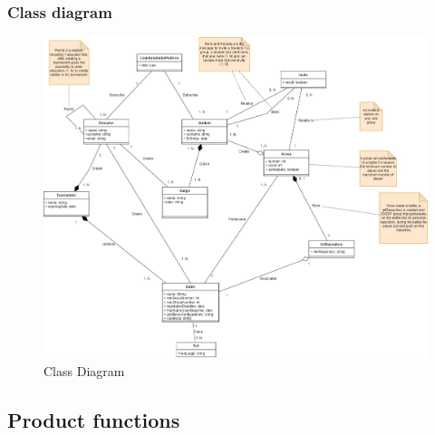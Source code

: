 \documentclass{article}
\begin{document}
{        \subsubsection{Class diagram}
        \begin{figure}[H]
            \centering
            \hspace*{-3cm}\includegraphics[scale=0.4]{images/ClassDiagram/ClassDiagramFinal.jpg}
            \caption{Class Diagram}
            \label{fig:classDiagram}
        \end{figure}
        
        \newpage
        
\subsection{Product functions}
}
\end{document}
